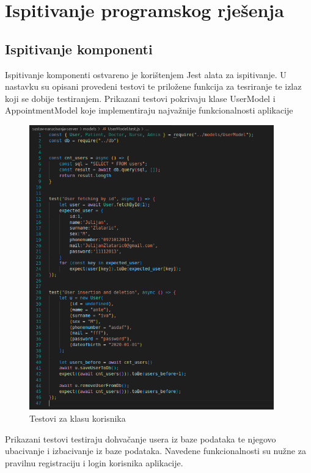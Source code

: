 			
			
			\eject 
		

		\section{Ispitivanje programskog rješenja}
	
			
			\subsection{Ispitivanje komponenti}
			Ispitivanje komponenti ostvareno je korištenjem Jest alata za ispitivanje. U nastavku su opisani provedeni testovi te priložene funkcija za tesriranje te izlaz koji se dobije testiranjem. Prikazani testovi pokrivaju klase UserModel i AppointmentModel koje implementiraju najvažnije funkcionalnosti aplikacije
    
            \begin{figure}[H]
                    \includegraphics[width=300pt]{slike/usermodel_tests_code.png} %
                    \caption{Testovi za klasu korisnika}
                    \label{fig:test1} %
                \end{figure}
                Prikazani testovi testiraju dohvačanje usera iz baze podataka te njegovo ubacivanje i izbacivanje iz baze podataka. Navedene funkcionalnosti su nužne za pravilnu registraciju i login korisnika aplikacije.
                \eject

